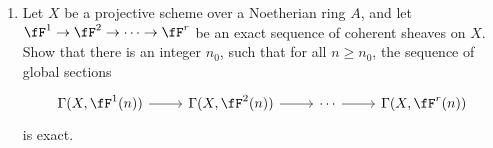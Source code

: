 \documentclass[a4paper]{article}
\begin{document}
\begin{enumerate} [label=\textbf{\arabic*.}, leftmargin=0em]



  \item[\textbf{10.}] Let $X$ be a projective scheme over a Noetherian ring $A$, and let $\fF^1 \to \fF^2 \to \cdots \to \fF^r$ be an exact sequence of coherent sheaves on $X$. Show that there is an integer $n_0$, such that for all $n \geq n_0$, the sequence of global sections
        \[ \begin{tikzcd}
            {\Gamma(X, \fF^1(n))} \arrow[r] & {\Gamma(X, \fF^2(n))} \arrow[r] & \cdots \arrow[r] & {\Gamma(X, \fF^r(n))}
          \end{tikzcd} \]
        is exact.


\end{enumerate}
\end{document}
